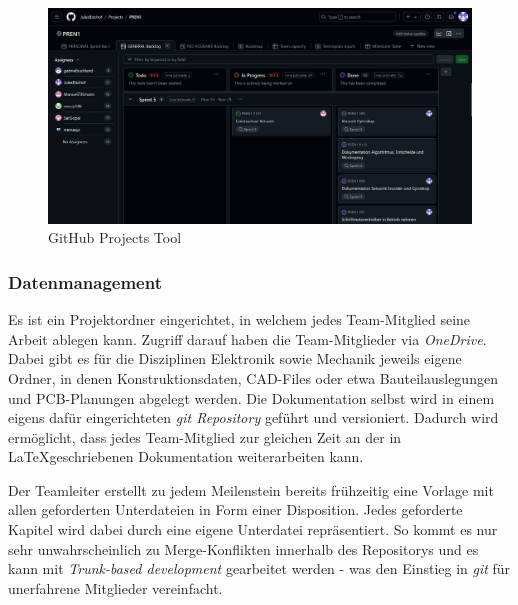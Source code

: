 \documentclass[main.tex]{subfiles} %
\begin{document}
\begin{figure}[h!]
    \centering
    \includegraphics[page=1, width=1\textwidth]{./fig_Projektmanagement/Ansicht_GitHubProjects.png}
    \caption{GitHub Projects Tool}\label{fig:GitHubProjectsTool}
\end{figure}

\subsubsection*{Datenmanagement}
Es ist ein Projektordner eingerichtet, in welchem jedes Team-Mitglied seine Arbeit ablegen kann. Zugriff darauf
haben die Team-Mitglieder via \textit{OneDrive}.
Dabei gibt es für die Disziplinen Elektronik sowie Mechanik jeweils eigene Ordner, in denen Konstruktionsdaten,
CAD-Files oder etwa Bauteilauslegungen und PCB-Planungen abgelegt werden. Die Dokumentation
selbst wird in einem eigens dafür eingerichteten \textit{git Repository} geführt und versioniert.
Dadurch wird ermöglicht, dass jedes Team-Mitglied zur gleichen Zeit an der in \LaTeX geschriebenen
Dokumentation weiterarbeiten kann.

Der Teamleiter erstellt zu jedem Meilenstein bereits frühzeitig eine Vorlage
mit allen geforderten Unterdateien in Form einer Disposition. Jedes geforderte
Kapitel wird dabei durch eine eigene Unterdatei repräsentiert. So kommt es nur
sehr unwahrscheinlich zu Merge-Konflikten innerhalb des Repositorys und es kann
mit \textit{Trunk-based development} gearbeitet werden - was den Einstieg in
\textit{git} für unerfahrene Mitglieder vereinfacht.
\end{document}
